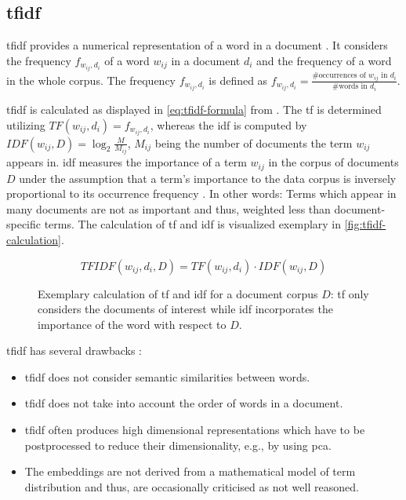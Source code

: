 \subsection{\acl*{tfidf}}\label{subsec:tfidf}

\ac{tfidf} provides a numerical representation of a word in a document \cite{clusteringDocs2020}.
It considers the frequency $f_{w_{ij}, d_i}$  of a word $w_{ij}$ in a document $d_i$ and the frequency of a word in the whole corpus. 
The frequency $f_{w_{ij}, d_i}$ is defined as $f_{w_{ij}, d_i} = \frac{\# \text{occurrences of } w_{ij} \text{ in }d_i}{\# \text{words in }d_i}$.

\ac{tfidf} is calculated as displayed in \autoref{eq:tfidf-formula} from \cite{clusteringDocs2020}.
The \ac{tf} is determined utilizing $TF(w_{ij}, d_i) = f_{w_{ij}, d_i}$, whereas the \ac{idf} is computed by $IDF(w_{ij}, D) = \log_2\frac{M}{M_{ij}}$, 
$M_{ij}$ being the number of documents the term $w_{ij}$ appears in.
\ac{idf} measures the importance of a term $w_{ij}$ in the corpus of documents $D$
under the assumption that a term's importance to the data corpus is inversely proportional to its occurrence frequency \cite{tfidf2008}.
In other words: Terms which appear in many documents are not as important and thus, weighted less than document-specific terms. 
The calculation of \ac{tf} and \ac{idf} is visualized exemplary in \autoref{fig:tfidf-calculation}.

\begin{equation}
    TFIDF(w_{ij}, d_i, D) = TF(w_{ij}, d_i) \cdot IDF(w_{ij}, D)
    \label{eq:tfidf-formula}
\end{equation}


\begin{figure}[htp] %
    \centering
    
    \caption[Exemplary calculation of \ac{tf} and \ac{idf} values]{
        Exemplary calculation of \ac{tf} and \ac{idf} for a document corpus $D$: 
        \ac{tf} only considers the documents of interest while 
        \ac{idf} incorporates the importance of the word with respect to $D$.
    }
    \label{fig:tfidf-calculation}
\end{figure}

\ac{tfidf} has several drawbacks \cite{clusteringDocs2020,tfidf2008}:
\begin{itemize}
    \item \ac{tfidf} does not consider semantic similarities between words.
    \item \ac{tfidf} does not take into account the order of words in a document.
    \item \ac{tfidf} often produces high dimensional representations which have to be postprocessed to reduce their dimensionality, e.g., by using \ac{pca}.
    \item The embeddings are not derived from a mathematical model of term distribution and thus, are occasionally criticised as not well reasoned.
\end{itemize}